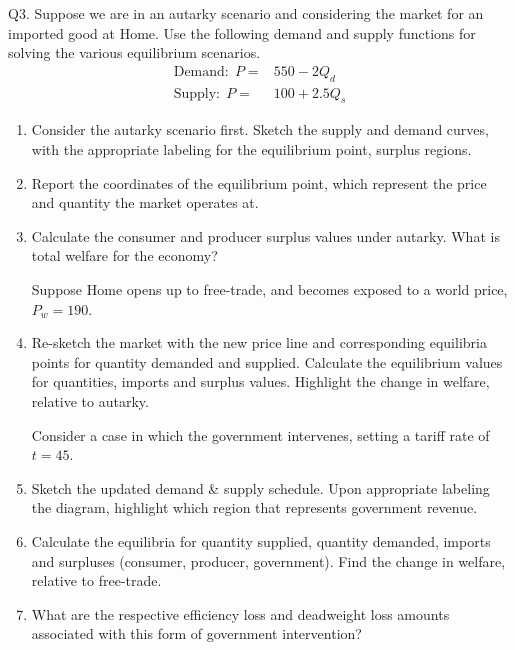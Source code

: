 \documentclass[12pt]{article}
\begin{document}
\newpage

\noindent Q3. Suppose we are in an autarky scenario and considering the market for an imported good at Home. 
Use the following demand and supply functions for solving the various equilibrium scenarios.
\begin{align*}
\text{Demand:} \ \  P = & 550 - 2 Q_d\\
\text{Supply:}\ \  P = & 100  + 2.5 Q_s
\end{align*}

\begin{enumerate}[1)]
	\item Consider the autarky scenario first. Sketch the supply and demand curves, with the appropriate labeling for the equilibrium point, surplus regions.
	
	\vspace{2.4in}
	
	\item Report the coordinates of the equilibrium point, which represent the price and quantity the market operates at.
	
	\vspace{1in}
	
	\item Calculate the consumer and producer surplus values under autarky.  What is total welfare for the economy?
	
	\vspace{1.4in}
	
	\noindent Suppose Home opens up to free-trade, and becomes exposed to a world price, $P_w = 190$. 
	
	\item Re-sketch the market with the new price line and corresponding equilibria points for quantity demanded and supplied. 
	Calculate the equilibrium values for quantities, imports and surplus values. 
	Highlight the change in welfare, relative to autarky. 
	
	\vspace{3in}
	
	\noindent Consider a case in which the government intervenes, setting a tariff rate of $t=45$. 
	
	\item Sketch the updated demand \& supply schedule. Upon appropriate labeling the diagram, highlight which region that represents government revenue.
	
	\vspace{3.5in}
	
	\item Calculate the equilibria for quantity supplied, quantity demanded, imports and surpluses (consumer, producer, government). 
	Find the change in welfare, relative to free-trade. 
	
	\vspace{2in}
	
	\item What are the respective efficiency loss and deadweight loss amounts associated with this form of government intervention?
	
\end{enumerate}
\end{document}

